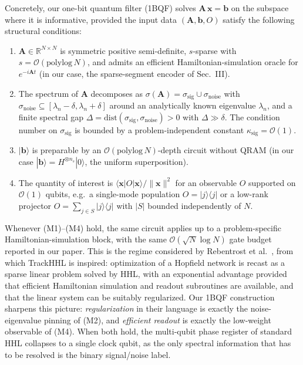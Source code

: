 \documentclass[11pt,a4paper]{article}
\newcommand{\OBQF}{\textsc{1BQF}}
\newcommand{\bra}[1]{\langle #1 |}
\newcommand{\ket}[1]{| #1 \rangle}
\begin{document}
Concretely, our one-bit quantum filter (\OBQF{}) solves
$\mathbf{A}\,\mathbf{x} = \mathbf{b}$ on the subspace where it is
informative, provided the input data $(\mathbf{A}, \mathbf{b}, O)$
satisfy the following structural conditions:
\begin{enumerate}[label=(\textbf{M\arabic*}),leftmargin=2.6em,topsep=2pt,itemsep=2pt]
  \item $\mathbf{A}\in\mathbb{R}^{N\times N}$ is symmetric positive
        semi-definite, $s$-sparse with $s = \mathcal{O}(\mathrm{polylog}\,N)$,
        and admits an efficient Hamiltonian-simulation oracle for
        $e^{-i\mathbf{A}t}$ (in our case, the sparse-segment encoder of
        Sec.~III).
  \item The spectrum of $\mathbf{A}$ decomposes as
        $\sigma(\mathbf{A}) = \sigma_\mathrm{sig} \cup \sigma_\mathrm{noise}$
        with
        $\sigma_\mathrm{noise} \subseteq [\lambda_n - \delta,
        \lambda_n + \delta]$ around an analytically known eigenvalue
        $\lambda_n$, and a finite spectral gap
        $\Delta = \mathrm{dist}(\sigma_\mathrm{sig},\sigma_\mathrm{noise}) > 0$
        with $\Delta \gg \delta$. The condition number on
        $\sigma_\mathrm{sig}$ is bounded by a problem-independent
        constant $\kappa_\mathrm{sig}=\mathcal{O}(1)$.
  \item $\ket{\mathbf{b}}$ is preparable by an
        $\mathcal{O}(\mathrm{polylog}\,N)$-depth circuit without QRAM
        (in our case $\ket{\mathbf{b}} = H^{\otimes n_s}\ket{0}$, the
        uniform superposition).
  \item The quantity of interest is
        $\bra{\mathbf{x}} O\ket{\mathbf{x}}/\|\mathbf{x}\|^{2}$ for an
        observable $O$ supported on $\mathcal{O}(1)$ qubits, e.g.\ a
        single-mode population $O = \ket{j}\bra{j}$ or a low-rank
        projector $O = \sum_{j\in S}\ket{j}\bra{j}$ with $|S|$ bounded
        independently of $N$.
\end{enumerate}
Whenever (M1)--(M4) hold, the same circuit applies up to a
problem-specific Hamiltonian-simulation block, with the same
$\mathcal{O}(\sqrt{N}\log N)$ gate budget reported in our paper.
This is the regime considered by Rebentrost et al.\
\cite{Rebentrost:2018:hopfield}, from which TrackHHL is inspired:
optimization of a Hopfield network is recast as a sparse linear problem
solved by HHL, with an exponential advantage provided that efficient
Hamiltonian simulation and readout subroutines are available, and that
the linear system can be suitably regularized. Our \OBQF{} construction
sharpens this picture: \emph{regularization} in their language is
exactly the noise-eigenvalue pinning of (M2), and \emph{efficient
readout} is exactly the low-weight observable of (M4). When both hold,
the multi-qubit phase register of standard HHL collapses to a single
clock qubit, as the only spectral information that has to be resolved
is the binary signal/noise label.
\end{document}

